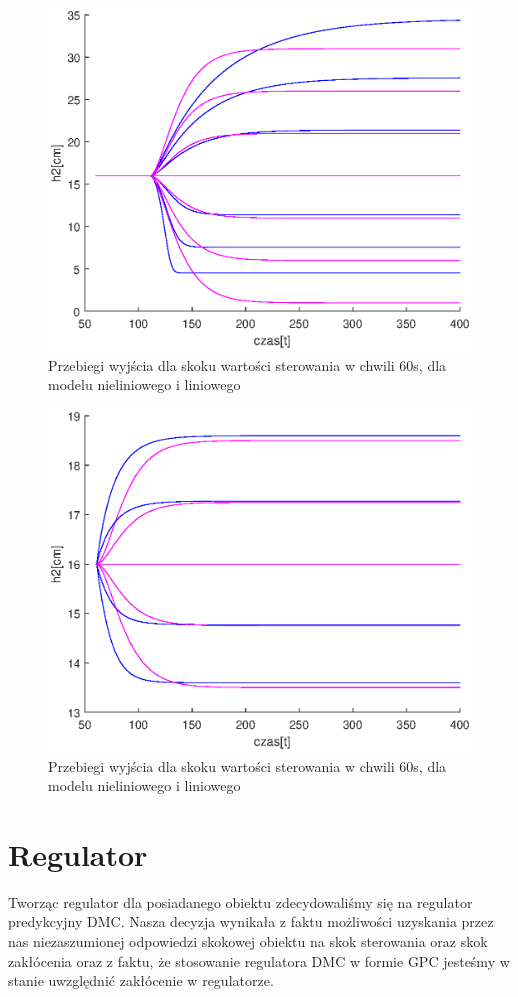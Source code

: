 		\begin{figure}
			\includegraphics[width=0.9\linewidth]{plots/z1_modellin_u.eps}
			\caption{Przebiegi wyjścia dla skoku wartości sterowania w chwili 60s, dla modelu nieliniowego i liniowego}
			\label{rys:modellin_u}
		\end{figure}
		\begin{figure}
			\includegraphics[width=0.9\linewidth]{plots/z1_modellin_z.eps}
			\caption{Przebiegi wyjścia dla skoku wartości sterowania w chwili 60s, dla modelu nieliniowego i liniowego}
			\label{rys:modellin_z}
		\end{figure}
		\newpage
	
	\section{Regulator}
		\label{sec:dmc}
		Tworząc regulator dla posiadanego obiektu zdecydowaliśmy się na regulator predykcyjny DMC. Nasza decyzja wynikała z faktu możliwości uzyskania przez nas niezaszumionej odpowiedzi skokowej obiektu na skok sterowania oraz skok zakłócenia oraz z faktu, że stosowanie regulatora DMC w formie GPC jesteśmy w stanie uwzględnić zakłócenie w regulatorze.
		
